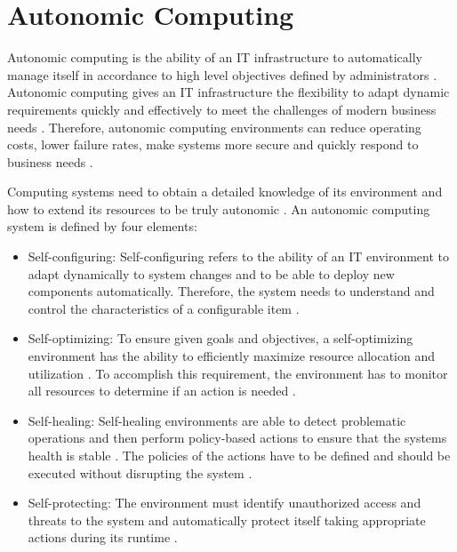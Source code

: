 \section{Autonomic Computing}
\label{sec:02_ac}
Autonomic computing is the ability of an IT infrastructure to automatically manage itself in accordance to high level objectives defined by administrators \cite{Kephart2003VisionComputing}.
Autonomic computing gives an IT infrastructure the flexibility to adapt dynamic requirements quickly and effectively to meet the challenges of modern business needs \cite{Murch2004Autonomic}. Therefore, autonomic computing environments can reduce operating costs, lower failure rates, make systems more secure and quickly respond to business needs \cite{Jacob2004AutonomicSolution}.


Computing systems need to obtain a detailed knowledge of its environment and how to extend its resources to be truly autonomic \cite{Murch2004Autonomic}.
An autonomic computing system is defined by four elements:
\begin{itemize}
\item Self-configuring:
Self-configuring refers to the ability of an IT environment to adapt dynamically to system changes and to be able to deploy new components automatically. Therefore, the system needs to understand and control the characteristics of a configurable item \cite{Murch2004Autonomic, Sinreich2006AnAB}.

\item Self-optimizing:
To ensure given goals and objectives, a self-optimizing environment has the ability to efficiently maximize resource allocation and utilization \cite{Jacob2004AutonomicSolution}. To accomplish this requirement, the environment has to monitor all resources to determine if an action is needed \cite{Murch2004Autonomic}.

\item Self-healing:
Self-healing environments are able to detect problematic operations and then perform policy-based actions to ensure that the systems health is stable \cite{Sinreich2006AnAB, Jacob2004AutonomicSolution}. The policies of the actions have to be defined and should be executed without disrupting the system \cite{Sinreich2006AnAB, Jacob2004AutonomicSolution}.

\item Self-protecting:
The environment must identify unauthorized access and threats to the system and automatically protect itself taking appropriate actions during its runtime \cite{Sinreich2006AnAB, Jacob2004AutonomicSolution}.
\end{itemize}


